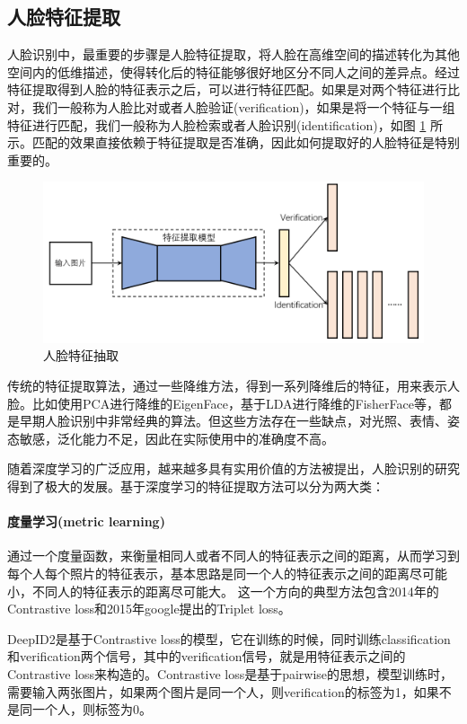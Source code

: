 \subsection{人脸特征提取}
人脸识别中，最重要的步骤是人脸特征提取，将人脸在高维空间的描述转化为其他空间内的低维描述，使得转化后的特征能够很好地区分不同人之间的差异点。经过特征提取得到人脸的特征表示之后，可以进行特征匹配。如果是对两个特征进行比对，我们一般称为人脸比对或者人脸验证(verification)，如果是将一个特征与一组特征进行匹配，我们一般称为人脸检索或者人脸识别(identification)，如图 \ref{fig:verification_identification} 所示。匹配的效果直接依赖于特征提取是否准确，因此如何提取好的人脸特征是特别重要的。


\begin{figure}[ht]
\centering
\includegraphics[scale=0.55]{img/chapter_fr/verification_identification.png}
\caption{人脸特征抽取}
\label{fig:verification_identification}
\end{figure}


传统的特征提取算法，通过一些降维方法，得到一系列降维后的特征，用来表示人脸。比如使用PCA进行降维的EigenFace，基于LDA进行降维的FisherFace等，都是早期人脸识别中非常经典的算法。但这些方法存在一些缺点，对光照、表情、姿态敏感，泛化能力不足，因此在实际使用中的准确度不高。

随着深度学习的广泛应用，越来越多具有实用价值的方法被提出，人脸识别的研究得到了极大的发展。基于深度学习的特征提取方法可以分为两大类：
\paragraph{度量学习(metric learning)}
通过一个度量函数，来衡量相同人或者不同人的特征表示之间的距离，从而学习到每个人每个照片的特征表示，基本思路是同一个人的特征表示之间的距离尽可能小，不同人的特征表示的距离尽可能大。
这一个方向的典型方法包含2014年的Contrastive loss\cite{sun2014deep}和2015年google提出的Triplet loss\cite{schroff2015facenet}。

DeepID2是基于Contrastive loss的模型，它在训练的时候，同时训练classification和verification两个信号，其中的verification信号，就是用特征表示之间的Contrastive loss来构造的。Contrastive loss是基于pairwise的思想，模型训练时，需要输入两张图片，如果两个图片是同一个人，则verification的标签为1，如果不是同一个人，则标签为0。

